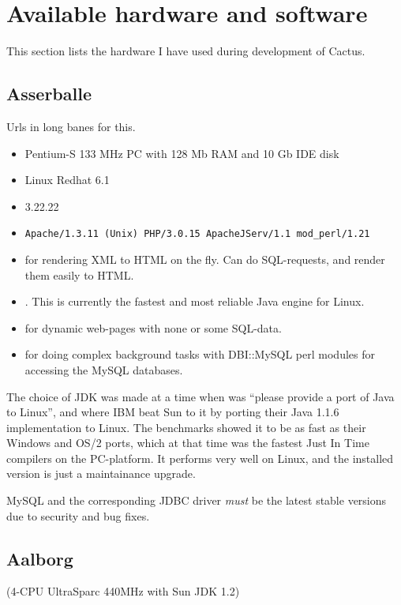 
\section{Available hardware and software}
\label{sec:availabe-hardware-and-software}

This section lists the hardware I have used during development of
Cactus.  


\subsection{Asserballe}
\label{sec:asserballe}

Urls in long banes for this.

\begin{itemize}
\item Pentium-S 133 MHz PC with 128 Mb RAM and 10 Gb IDE disk
\item Linux Redhat 6.1  
\item {} 3.22.22
\item \texttt{Apache/1.3.11 (Unix) PHP/3.0.15 ApacheJServ/1.1 mod\_perl/1.21
}
\item {} for rendering XML to
  HTML on the fly.  Can do SQL-requests, and render them easily to
  HTML.
\item {}.  This is currently the fastest and most reliable Java
  engine for Linux.
\item {} for dynamic web-pages with none
  or some SQL-data.
\item {} for doing complex
  background tasks with DBI::MySQL perl modules for accessing
  the MySQL databases.
\end{itemize}

The choice of JDK was made at a time when
 was ``please provide a
port of Java to Linux'', and where IBM beat Sun to it by porting their
Java 1.1.6 implementation to Linux.  The benchmarks showed it to be as
fast as their Windows and OS/2 ports, which at that time was the
fastest Just In Time compilers on the PC-platform.  It performs very
well on Linux, and the installed version is just a maintainance
upgrade.

MySQL and the corresponding JDBC driver \textit{must} be the latest
stable versions due to security and bug fixes.


\subsection{Aalborg}
\label{sec:aalborg}


(4-CPU UltraSparc 440MHz with Sun JDK 1.2)



